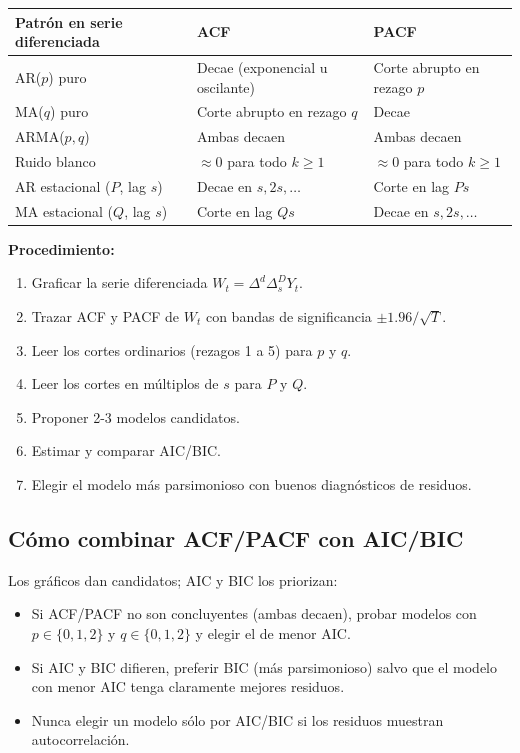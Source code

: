 \documentclass[12pt,a4paper]{article}
\theoremstyle{definition}
\begin{document}
\begin{center}
\renewcommand{\arraystretch}{1.3}
\begin{tabular}{lll}
\toprule
\textbf{Patrón en serie diferenciada} & \textbf{ACF} & \textbf{PACF} \\
\midrule
AR($p$) puro & Decae (exponencial u oscilante) & Corte abrupto en rezago $p$ \\
MA($q$) puro & Corte abrupto en rezago $q$ & Decae \\
ARMA($p,q$) & Ambas decaen & Ambas decaen \\
Ruido blanco & $\approx 0$ para todo $k \geq 1$ & $\approx 0$ para todo $k \geq 1$ \\
\midrule
AR estacional ($P$, lag $s$) & Decae en $s,2s,\ldots$ & Corte en lag $Ps$ \\
MA estacional ($Q$, lag $s$) & Corte en lag $Qs$ & Decae en $s,2s,\ldots$ \\
\bottomrule
\end{tabular}
\end{center}

\noindent\textbf{Procedimiento:}
\begin{enumerate}
  \item Graficar la serie diferenciada $W_t = \Delta^d \Delta_s^D Y_t$.
  \item Trazar ACF y PACF de $W_t$ con bandas de significancia $\pm 1.96/\sqrt{T}$.
  \item Leer los cortes ordinarios (rezagos 1 a 5) para $p$ y $q$.
  \item Leer los cortes en múltiplos de $s$ para $P$ y $Q$.
  \item Proponer 2-3 modelos candidatos.
  \item Estimar y comparar AIC/BIC.
  \item Elegir el modelo más parsimonioso con buenos diagnósticos de residuos.
\end{enumerate}

\subsection{Cómo combinar ACF/PACF con AIC/BIC}

Los gráficos dan candidatos; AIC y BIC los priorizan:
\begin{itemize}[nosep]
  \item Si ACF/PACF no son concluyentes (ambas decaen), probar modelos con
        $p \in \{0,1,2\}$ y $q \in \{0,1,2\}$ y elegir el de menor AIC.
  \item Si AIC y BIC difieren, preferir BIC (más parsimonioso) salvo que el
        modelo con menor AIC tenga claramente mejores residuos.
  \item Nunca elegir un modelo sólo por AIC/BIC si los residuos muestran
        autocorrelación.
\end{itemize}
\end{document}
